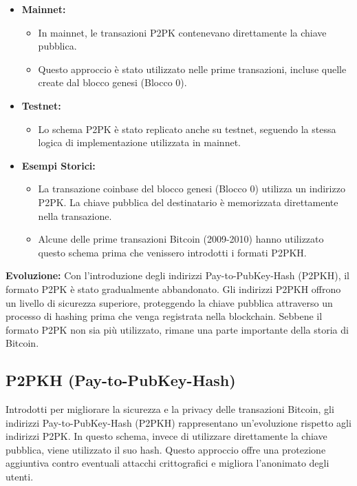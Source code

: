 \documentclass{article}
\begin{document}
\begin{itemize}
    \item \textbf{Mainnet:}
    \begin{itemize}
        \item In mainnet, le transazioni P2PK contenevano direttamente la chiave pubblica.
        \item Questo approccio è stato utilizzato nelle prime transazioni, incluse quelle create dal blocco genesi (Blocco 0).
    \end{itemize}
    \item \textbf{Testnet:}
    \begin{itemize}
        \item Lo schema P2PK è stato replicato anche su testnet, seguendo la stessa logica di implementazione utilizzata in mainnet.
    \end{itemize}
    \item \textbf{Esempi Storici:}
    \begin{itemize}
        \item La transazione coinbase del blocco genesi (Blocco 0) utilizza un indirizzo P2PK. La chiave pubblica del destinatario è memorizzata direttamente nella transazione.
        \item Alcune delle prime transazioni Bitcoin (2009-2010) hanno utilizzato questo schema prima che venissero introdotti i formati P2PKH.
    \end{itemize}
\end{itemize}

\textbf{Evoluzione:} Con l'introduzione degli indirizzi Pay-to-PubKey-Hash (P2PKH), il formato P2PK è stato gradualmente abbandonato. Gli indirizzi P2PKH offrono un livello di sicurezza superiore, proteggendo la chiave pubblica attraverso un processo di hashing prima che venga registrata nella blockchain. Sebbene il formato P2PK non sia più utilizzato, rimane una parte importante della storia di Bitcoin.

\subsection{P2PKH (Pay-to-PubKey-Hash)}
Introdotti per migliorare la sicurezza e la privacy delle transazioni Bitcoin, gli indirizzi Pay-to-PubKey-Hash (P2PKH) rappresentano un'evoluzione rispetto agli indirizzi P2PK. In questo schema, invece di utilizzare direttamente la chiave pubblica, viene utilizzato il suo hash. Questo approccio offre una protezione aggiuntiva contro eventuali attacchi crittografici e migliora l'anonimato degli utenti.
\end{document}
